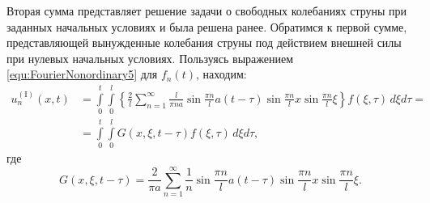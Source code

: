 Вторая сумма представляет решение задачи о свободных колебаниях струны при заданных начальных условиях и была решена ранее. Обратимся к первой сумме, представляющей вынужденные колебания струны под действием внешней силы при нулевых начальных условиях. Пользуясь выражением \eqref{equ:FourierNonordinary5} для $f_n(t)$, находим:
\begin{align*}
	u_n^{(\mathrm{I})} (x, t) &= \int\limits_0^t \int\limits_0^l \left\{\frac{2}{l} \sum\limits_{n = 1}^\infty \frac{l}{\pi n a} \sin \frac{\pi n}{l} a(t - \tau) \sin \frac{\pi n}{l} x \sin \frac{\pi n}{l} \xi \right\} f(\xi, \tau)\, d\xi d\tau =\\
	&=\int\limits_0^t \int\limits_0^l G(x, \xi, t - \tau) f(\xi, \tau)\, d\xi d\tau,
\end{align*}
где 
\[
	G(x, \xi, t - \tau) = \frac{2}{\pi a} \sum\limits_{n = 1}^\infty \frac{1}{n} \sin \frac{\pi n}{l} a(t - \tau) \sin \frac{\pi n}{l} x \sin \frac{\pi n}{l} \xi.
\]
